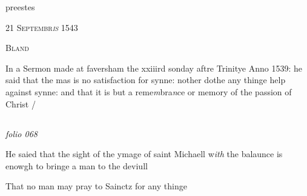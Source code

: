 \documentclass[12pt, a4paper]{book}
\begin{document}
		\ifthenelse{\isodd{\thepage}}
		{\reversemarginpar}
		{\normalmarginpar}
		 preestes
		
		 
		
		            
            
               
				\begin{center} \begin{large} {\scshape 
                  21 Septembr\textit{is} 1543
               } \end{large} \end{center}
			
               
                  
				\begin{center}  {\scshape Bland}  \end{center}
			

               	
		\ifthenelse{\isodd{\thepage}}
		{\reversemarginpar}
		{\normalmarginpar}
		In a Sermon made at faversham the xxiiird sonday
 aftre Trinitye Anno 1539: he said that the mas
 is no satisfaction for synne: nother dothe any thinge
 help against synne: and that it is but a reme\textit{m}bra\textit{n}ce
 or memory of the passion of Christ /



\dotfill
						\newpage {} \subsection*{}  \subsection*{}

\textit{folio 068}



	
			
	
		\ifthenelse{\isodd{\thepage}}
		{\reversemarginpar}
		{\normalmarginpar}
		He saied that the sight of the ymage of saint
 Michaell w\textit{ith} the balaunce is enowgh to
 bringe a man to the deviull
 
 	
			
 	
		\ifthenelse{\isodd{\thepage}}
		{\reversemarginpar}
		{\normalmarginpar}
		That no man may pray to Sainctz for any thinge
 
\end{document}
